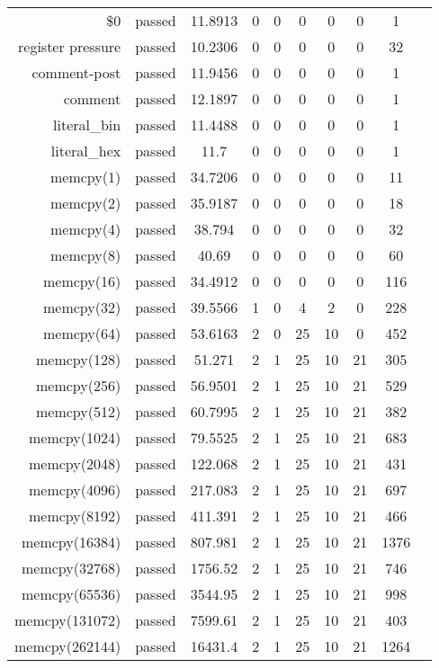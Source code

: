 \begin{longtable}{r|ccccccccc}
    \$0 & passed & 11.8913 & 0 & 0 & 0 & 0 & 0 & 1 \\
    register pressure & passed & 10.2306 & 0 & 0 & 0 & 0 & 0 & 32 \\
    comment-post & passed & 11.9456 & 0 & 0 & 0 & 0 & 0 & 1 \\
    comment & passed & 12.1897 & 0 & 0 & 0 & 0 & 0 & 1 \\
    literal\_bin & passed & 11.4488 & 0 & 0 & 0 & 0 & 0 & 1 \\
    literal\_hex & passed & 11.7 & 0 & 0 & 0 & 0 & 0 & 1 \\
    memcpy(1) & passed & 34.7206 & 0 & 0 & 0 & 0 & 0 & 11 \\
    memcpy(2) & passed & 35.9187 & 0 & 0 & 0 & 0 & 0 & 18 \\
    memcpy(4) & passed & 38.794 & 0 & 0 & 0 & 0 & 0 & 32 \\
    memcpy(8) & passed & 40.69 & 0 & 0 & 0 & 0 & 0 & 60 \\
    memcpy(16) & passed & 34.4912 & 0 & 0 & 0 & 0 & 0 & 116 \\
    memcpy(32) & passed & 39.5566 & 1 & 0 & 4 & 2 & 0 & 228 \\
    memcpy(64) & passed & 53.6163 & 2 & 0 & 25 & 10 & 0 & 452 \\
    memcpy(128) & passed & 51.271 & 2 & 1 & 25 & 10 & 21 & 305 \\
    memcpy(256) & passed & 56.9501 & 2 & 1 & 25 & 10 & 21 & 529 \\
    memcpy(512) & passed & 60.7995 & 2 & 1 & 25 & 10 & 21 & 382 \\
    memcpy(1024) & passed & 79.5525 & 2 & 1 & 25 & 10 & 21 & 683 \\
    memcpy(2048) & passed & 122.068 & 2 & 1 & 25 & 10 & 21 & 431 \\
    memcpy(4096) & passed & 217.083 & 2 & 1 & 25 & 10 & 21 & 697 \\
    memcpy(8192) & passed & 411.391 & 2 & 1 & 25 & 10 & 21 & 466 \\
    memcpy(16384) & passed & 807.981 & 2 & 1 & 25 & 10 & 21 & 1376 \\
    memcpy(32768) & passed & 1756.52 & 2 & 1 & 25 & 10 & 21 & 746 \\
    memcpy(65536) & passed & 3544.95 & 2 & 1 & 25 & 10 & 21 & 998 \\
    memcpy(131072) & passed & 7599.61 & 2 & 1 & 25 & 10 & 21 & 403 \\
    memcpy(262144) & passed & 16431.4 & 2 & 1 & 25 & 10 & 21 & 1264 \\

\end{longtable}
